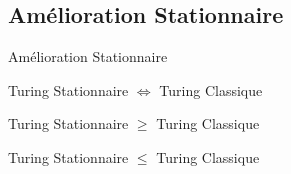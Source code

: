 \documentclass[12pt]{beamer}
\begin{document}
\subsection{Amélioration Stationnaire}
\begin{frame}{Amélioration Stationnaire}
    \begin{center}
        
    \Large Turing Stationnaire $\Longleftrightarrow$ Turing Classique

    \pause

    \vspace{1cm}

    \Large Turing Stationnaire $\geq$ Turing Classique

    \pause

    \vspace{1cm}

    \Large Turing Stationnaire $\leq$ Turing Classique
    
    \end{center}

    
\end{frame}
\end{document}
